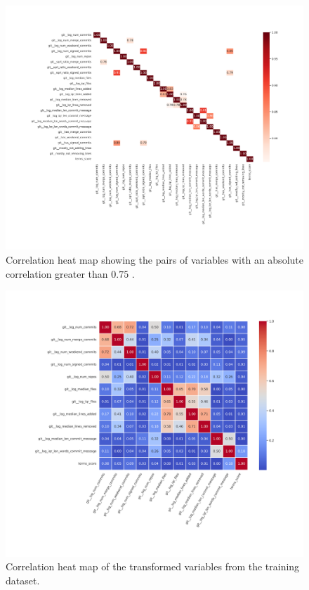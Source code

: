 \documentclass[a4paper, 12pt]{book}
\begin{document}
\begin{figure}
 \centering
  \includegraphics[width=18cm, keepaspectratio]{img/eda_corr_heatmap_more_75.png}
  \caption{Correlation heat map showing the pairs of variables with an absolute correlation greater than $0.75$ .}
  \label{fig:corr-heatmap-greater-075}
\end{figure}


\begin{figure}
 \centering
  \includegraphics[width=18cm, keepaspectratio]{img/eda_corr_heatmap_correlation_fixed.png}
  \caption{Correlation heat map of the transformed variables from the training dataset.}
  \label{fig:corr-heatmap-after}
\end{figure}
\end{document}
